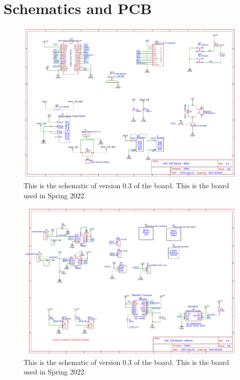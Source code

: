 \section{Schematics and PCB}
\begin{landscape}
\begin{figure}[!htb]
	\centering
	\includegraphics[width=\paperwidth]{arduinoStart/Schematic_CEC326v0.5_Main} %
	\caption{This is the schematic of version 0.3 of the board. This is the board used in Spring 2022.}
	\label{fig:boardSchematic}
\end{figure} 

\begin{figure}[!htb]
	\centering
	\includegraphics[width=\paperwidth]{arduinoStart/Schematic_CEC326v0.5_Motors} %
	\caption{This is the schematic of version 0.3 of the board. This is the board used in Spring 2022.}
	\label{fig:boardSchematic}
\end{figure} 


\end{landscape}
